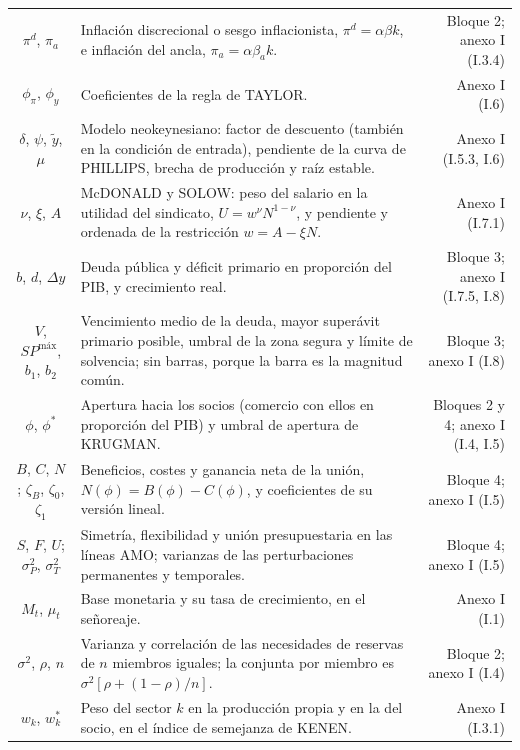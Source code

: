 \documentclass[10pt,a4paper]{article}
\begin{document}
\begin{longtable}{SMD}
$\pi^d$, $\pi_a$ & Inflación discrecional o sesgo inflacionista, $\pi^d=\alpha\beta k$, e inflación del ancla, $\pi_a=\alpha\beta_a k$. & Bloque 2; anexo I (I.3.4)\\
$\phi_\pi$, $\phi_y$ & Coeficientes de la regla de TAYLOR. & Anexo I (I.6)\\
$\delta$, $\psi$, $\tilde y$, $\mu$ & Modelo neokeynesiano: factor de descuento (también en la condición de entrada), pendiente de la curva de PHILLIPS, brecha de producción y raíz estable. & Anexo I (I.5.3, I.6)\\
$\nu$, $\xi$, $A$ & McDONALD y SOLOW: peso del salario en la utilidad del sindicato, $U=w^{\nu}N^{1-\nu}$, y pendiente y ordenada de la restricción $w=A-\xi N$. & Anexo I (I.7.1)\\
$b$, $d$, $\Delta y$ & Deuda pública y déficit primario en proporción del PIB, y crecimiento real. & Bloque 3; anexo I (I.7.5, I.8)\\
$V$, $SP^{\text{máx}}$, $b_1$, $b_2$ & Vencimiento medio de la deuda, mayor superávit primario posible, umbral de la zona segura y límite de solvencia; sin barras, porque la barra es la magnitud común. & Bloque 3; anexo I (I.8)\\
$\phi$, $\phi^*$ & Apertura hacia los socios (comercio con ellos en proporción del PIB) y umbral de apertura de KRUGMAN. & Bloques 2 y 4; anexo I (I.4, I.5)\\
$B$, $C$, $N$; $\zeta_B$, $\zeta_0$, $\zeta_1$ & Beneficios, costes y ganancia neta de la unión, $N(\phi)=B(\phi)-C(\phi)$, y coeficientes de su versión lineal. & Bloque 4; anexo I (I.5)\\
$S$, $F$, $U$; $\sigma_P^2$, $\sigma_T^2$ & Simetría, flexibilidad y unión presupuestaria en las líneas AMO; varianzas de las perturbaciones permanentes y temporales. & Bloque 4; anexo I (I.5)\\
$M_t$, $\mu_t$ & Base monetaria y su tasa de crecimiento, en el señoreaje. & Anexo I (I.1)\\
$\sigma^2$, $\rho$, $n$ & Varianza y correlación de las necesidades de reservas de $n$ miembros iguales; la conjunta por miembro es $\sigma^2[\rho+(1-\rho)/n]$. & Bloque 2; anexo I (I.4)\\
$w_k$, $w_k^*$ & Peso del sector $k$ en la producción propia y en la del socio, en el índice de semejanza de KENEN. & Anexo I (I.3.1)\\
\end{longtable}
\end{document}
